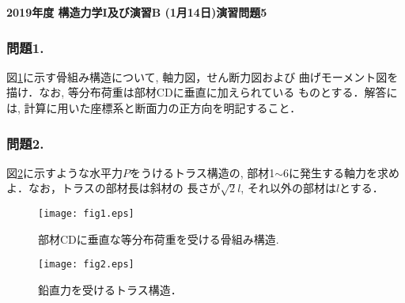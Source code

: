 \documentclass[10pt,a4j]{jarticle}
\newlength{\minitwocolumn}
\begin{document}
\newcommand{\fat}[1]{\mbox{\boldmath $#1$}}
\newcommand{\D}{\partial}
\newcommand{\w}{\omega}
\newcommand{\ga}{\alpha}
\newcommand{\gb}{\beta}
\newcommand{\gx}{\xi}
\newcommand{\gz}{\zeta}
\newcommand{\vhat}[1]{\hat{\fat{#1}}}
\newcommand{\spc}{\vspace{0.7\baselineskip}}
\newcommand{\halfspc}{\vspace{0.3\baselineskip}}

\pagestyle{empty}
\newcommand{\twofig}[2]
 {
   \begin{figure}[h]
     \begin{minipage}[t]{\minitwocolumn}
         \begin{center}   #1
         \end{center}
     \end{minipage}
         \hspace{\columnsep}
     \begin{minipage}[t]{\minitwocolumn}
         \begin{center} #2
         \end{center}
     \end{minipage}
   \end{figure}
 }
\begin{center}
{\Large \bf 2019年度 構造力学I及び演習B (1月14日)演習問題5} \\
\end{center}
\subsubsection*{問題1.}
図\ref{fig:fig1}に示す骨組み構造について, 軸力図，せん断力図および
曲げモーメント図を描け．なお, 等分布荷重は部材CDに垂直に加えられている
ものとする．解答には, 計算に用いた座標系と断面力の正方向を明記すること．
\subsubsection*{問題2.}
図\ref{fig:fig2}に示すような水平力$P$をうけるトラス構造の, 
部材1$\sim$6に発生する軸力を求めよ．なお，トラスの部材長は斜材の
長さが$\sqrt{2}l$, それ以外の部材は$l$とする．
\begin{figure}[h]
	\begin{center}
	\texttt{[image: fig1.eps]} 
	\end{center}
	\caption{部材CDに垂直な等分布荷重を受ける骨組み構造.}
	\label{fig:fig1}
\end{figure}
\begin{figure}[h]
	\begin{center}
	\texttt{[image: fig2.eps]} 
	\end{center}
	\caption{鉛直力を受けるトラス構造．} 
	\label{fig:fig2}
\end{figure}
\end{document}
